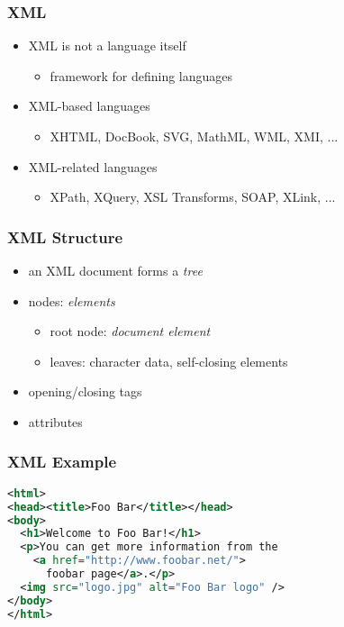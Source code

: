 \documentclass[dvipsnames]{beamer}
\theoremstyle{plain}
\begin{document}
\begin{frame}
  \frametitle{XML}

  \begin{itemize}
    \item XML is not a language itself
    \begin{itemize}
      \item framework for defining languages
    \end{itemize}

    \pause
    \item XML-based languages
    \begin{itemize}
      \item XHTML, DocBook, SVG, MathML, WML, XMI, ...
    \end{itemize}

    \pause
    \item XML-related languages
    \begin{itemize}
      \item XPath, XQuery, XSL Transforms, SOAP, XLink, ...
    \end{itemize}
  \end{itemize}
\end{frame}

\begin{frame}
  \frametitle{XML Structure}

  \begin{itemize}
    \item an XML document forms a \emph{tree}

    \item nodes: \emph{elements}
    \begin{itemize}
      \item root node: \emph{document element}
      \item leaves: character data, self-closing elements
    \end{itemize}

    \pause
    \medskip
    \item opening/closing tags
    \item attributes
  \end{itemize}
\end{frame}

\begin{frame}[fragile]
  \frametitle{XML Example}

  \begin{example}[HTML]
    \begin{lstlisting}[language=XML]
<html>
<head><title>Foo Bar</title></head>
<body>
  <h1>Welcome to Foo Bar!</h1>
  <p>You can get more information from the
    <a href="http://www.foobar.net/">
      foobar page</a>.</p>
  <img src="logo.jpg" alt="Foo Bar logo" />
</body>
</html>
    \end{lstlisting}
  \end{example}
\end{frame}
\end{document}
